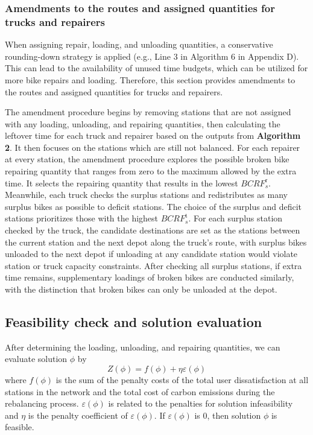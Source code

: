 \subsubsection{Amendments to the routes and assigned quantities for trucks and repairers}\label{ch4:subsubsec:route-quantity-amendments}

When assigning repair, loading, and unloading quantities, a conservative rounding-down strategy is
applied (e.g., Line 3 in Algorithm 6 in Appendix D). This can lead to the availability of unused
time budgets, which can be utilized for more bike repairs and loading. Therefore, this section
provides amendments to the routes and assigned quantities for trucks and repairers.

The amendment procedure begins by removing stations that are not assigned with any loading,
unloading, and repairing quantities, then calculating the leftover time for each truck and repairer
based on the outputs from \textbf{Algorithm 2}. It then focuses on the stations which are still not
balanced. For each repairer at every station, the amendment procedure explores the possible broken
bike repairing quantity that ranges from zero to the maximum allowed by the extra time. It selects
the repairing quantity that results in the lowest \(\mathit{BCR}F_{s}^{\text{r}}\). Meanwhile, each
truck checks the surplus stations and redistributes as many surplus bikes as possible to deficit
stations. The choice of the surplus and deficit stations prioritizes those with the highest
\(\mathit{BCR}F_{s}^{\text{t}}\). For each surplus station checked by the truck, the candidate
destinations are set as the stations between the current station and the next depot along the
truck's route, with surplus bikes unloaded to the next depot if unloading at any candidate station
would violate station or truck capacity constraints. After checking all surplus stations, if extra
time remains, supplementary loadings of broken bikes are conducted similarly, with the distinction
that broken bikes can only be unloaded at the depot.

\subsection{Feasibility check and solution evaluation}\label{ch4:subsec:feasibility-check-and-solution-evaluation}

After determining the loading, unloading, and repairing quantities, we can evaluate solution
\(\phi\) by\begin{equation}
\label{ch4:eq:70}
Z(\phi) = f(\phi) + \eta\varepsilon(\phi)
\end{equation}where \(f(\phi)\) is the sum of the
penalty costs of the total user dissatisfaction at all stations in the network and the total cost of
carbon emissions during the rebalancing process. \(\varepsilon(\phi)\) is related to the penalties
for solution infeasibility and \(\eta\) is the penalty coefficient of \(\varepsilon(\phi)\). If
\(\varepsilon(\phi)\) is 0, then solution \(\phi\) is feasible.

